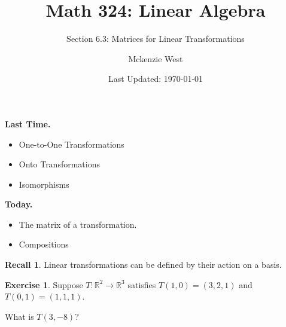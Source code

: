 \documentclass{beamer}
\newcommand{\R}{\mathbb{R}}
\newcommand{\fn}{\insertframenumber}
\theoremstyle{definition}
\newtheorem{exercise}{Exercise}
\newtheorem*{recall}{Recall}
\begin{document}
	\title{Math 324: Linear Algebra}
	\subtitle{Section 6.3: Matrices for Linear Transformations}
	\author{Mckenzie West}
	\date{Last Updated: \today}
\begin{frame}[fragile]
\maketitle	
\end{frame}

\begin{frame}{\insertframenumber}
	\begin{block}{\textbf{Last Time.}}
	\begin{itemize}[label=--]
		\item One-to-One Transformations
		\item Onto Transformations
		\item Isomorphisms
	\end{itemize}
	\end{block}
	\begin{block}{\textbf{Today.}}
		\begin{itemize}[label=--]
			\item The matrix of a transformation.
			\item Compositions
		\end{itemize}
	\end{block}
\end{frame}
\begin{frame}{\fn}
	\begin{recall}
		Linear transformations can be defined by their action on a basis.
	\end{recall}
	\begin{exercise}
		Suppose $T:\R^2\to\R^3$ satisfies $T(1,0)=(3,2,1)$ and $T(0,1)=(1,1,1)$.
		
		What is $T(3,-8)$?
	\end{exercise}
\end{frame}
\end{document}
